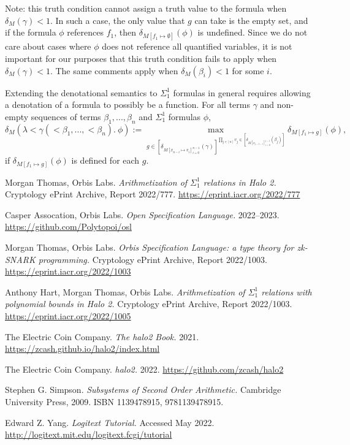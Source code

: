 \documentclass[11pt]{article}
\begin{document}
\begin{enumerate}
		Note: this truth condition cannot assign a truth value to the formula when $\delta_M(\gamma) < 1$.
		In such a case, the only value that $g$ can take is the empty set, and
		if the formula $\phi$ references $f_1$, then $\delta_{M[f_1 \mapsto \emptyset]}(\phi)$
		is undefined. Since we do not care about cases where $\phi$ does not reference
		all quantified variables, it is not important for our purposes that this
		truth condition fails to apply when $\delta_M(\gamma) < 1$. The same comments
		apply when $\delta_M(\beta_i) < 1$ for some $i$.
\end{enumerate}

Extending the denotational semantics to $\Sigma^1_1$ formulas in general requires allowing a denotation of a formula to possibly be a function.
For all terms $\gamma$ and non-empty sequences of terms $\beta_1, ..., \beta_n$ and $\Sigma^1_1$ formulas $\phi$,
\begin{equation}
	\delta_M(\lambda <\gamma(<\beta_1, ..., <\beta_n).\ \phi)
	:= \max_{g \in [\delta_{M[x_{n-i} \mapsto v_i]_{i=0}^{n-1}}(\gamma)]^{\prod_{j \in [n]} v_j \in [\delta_{M[x_{j-1-i}]_{i=0}^{j-1}}(\beta_j)]}} \delta_{M[f_1 \mapsto g]}(\phi),
\end{equation}
if $\delta_{M[f_1 \mapsto g]}(\phi)$ is defined for each $g$.


\clearpage

\begin{thebibliography}{6}
	
	 Morgan Thomas, Orbis Labs. \textit{Arithmetization of $\Sigma^1_1$ relations in Halo 2.} Cryptology ePrint Archive, Report 2022/777. \url{https://eprint.iacr.org/2022/777}

	 Casper Assocation, Orbis Labs. \textit{Open Specification Language.} 2022--2023. \url{https://github.com/Polytopoi/osl}

	 Morgan Thomas, Orbis Labs. \textit{Orbis Specification Language: a type theory for zk-SNARK programming.} Cryptology ePrint Archive, Report 2022/1003. \url{https://eprint.iacr.org/2022/1003}

	 Anthony Hart, Morgan Thomas, Orbis Labs. \textit{Arithmetization of $\Sigma^1_1$ relations with polynomial bounds in Halo 2.} Cryptology ePrint Archive, Report 2022/1003. \url{https://eprint.iacr.org/2022/1005}

	 The Electric Coin Company. \textit{The halo2 Book.} 2021. \url{https://zcash.github.io/halo2/index.html}

	 The Electric Coin Company. \textit{halo2.} 2022. \url{https://github.com/zcash/halo2}

	 Stephen G. Simpson. \textit{Subsystems of Second Order Arithmetic.} Cambridge University Press, 2009. ISBN 1139478915, 9781139478915.

	 Edward Z. Yang. \textit{Logitext Tutorial.} Accessed May 2022. \url{http://logitext.mit.edu/logitext.fcgi/tutorial}



\end{thebibliography}
\end{document}
